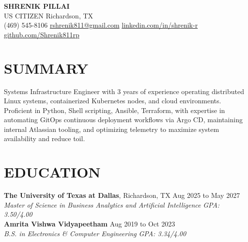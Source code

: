\documentclass[11pt,letterpaper]{article}
\begin{document}
\begin{center}
{\LARGE \textbf{SHRENIK PILLAI}} \\ \vspace{2pt}
\small US CITIZEN \quad Richardson, TX \\ \vspace{1pt}
\small (469) 545-8106 \quad \href{mailto:rshrenik811@gmail.com}{rshrenik811@gmail.com} \quad \href{https://linkedin.com/in/shrenik-r}{linkedin.com/in/shrenik-r} \quad \href{https://github.com/Shrenik811rp}{github.com/Shrenik811rp}
\end{center}
\section*{SUMMARY}
\noindent\small Systems Infrastructure Engineer with 3 years of experience operating distributed Linux systems, containerized Kubernetes nodes, and cloud environments. Proficient in Python, Shell scripting, Ansible, Terraform, with expertise in automating GitOps continuous deployment workflows via Argo CD, maintaining internal Atlassian tooling, and optimizing telemetry to maximize system availability and reduce toil.
\section*{EDUCATION}
\noindent\small \textbf{The University of Texas at Dallas}, Richardson, TX \hfill Aug 2025 to May 2027 \\
\textit{Master of Science in Business Analytics and Artificial Intelligence} \hfill \textit{GPA: 3.50/4.00} \\
\noindent\small \textbf{Amrita Vishwa Vidyapeetham} \hfill Aug 2019 to Oct 2023 \\
\textit{B.S. in Electronics \& Computer Engineering} \hfill \textit{GPA: 3.34/4.00}
\end{document}

